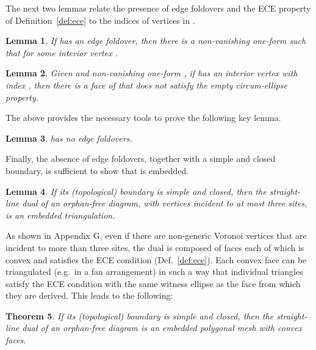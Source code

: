 \documentclass[11pt]{article}
\newtheorem{theorem}{Theorem}[section]
\newtheorem{lemma}[theorem]{Lemma}
\begin{document}
The next two lemmas relate the presence of edge foldovers and 
the ECE property of Definition~\ref{def:ece}  to the indices of vertices in . 





\begin{lemma}\label{lem:index-1}
If  has an edge foldover, then there is a non-vanishing one-form  such
that  for some interior vertex . \end{lemma}


\begin{lemma}\label{lem:index1}
Given  and non-vanishing one-form , if  has an interior vertex  with index
, then there is a face  of
 that does not satisfy the empty circum-ellipse property. 
\end{lemma}

The above provides the necessary tools to prove the following key lemma. 


\begin{lemma}\label{lem:ef}
 has no edge foldovers. 
\end{lemma}



Finally, the absence of edge foldovers, together with a simple and closed boundary, 
is sufficient to show that  is 
embedded.





\begin{lemma}\label{lem:main-weak}
If its (topological) boundary is simple and closed, then the straight-line dual  of an orphan-free diagram, with vertices incident to at most three sites, is an embedded triangulation. 
\end{lemma}

As shown in Appendix G, even if there are non-generic Voronoi vertices that are incident to more than three sites, the dual is composed of faces each of which is convex and satisfies the ECE condition (Def.~\ref{def:ece}). Each convex face can be triangulated (e.g.\ in a fan arrangement) in such a way that individual triangles satisfy the ECE condition with the same witness ellipse as the face from which they are derived. This leads to the following:


\begin{theorem}\label{th:main}
If its (topological) boundary is simple and closed, then the straight-line dual  of an orphan-free diagram is an  embedded polygonal mesh with convex faces. 
\end{theorem}
\end{document}
